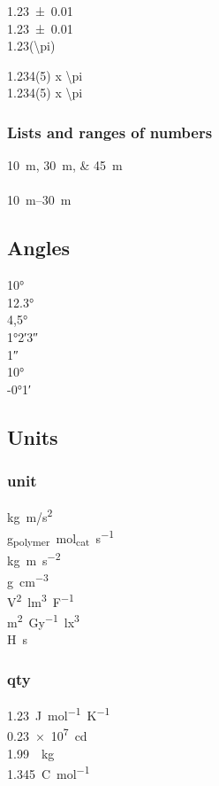 \documentclass{article}
\begin{document}
\num{1.23(1)}\\
\num{1.23\pm0.01}\\
\num[parse-numbers=false]{1.23(\pi)}

\num[parse-numbers=false]{1.234(5) x \pi} \\
\num[uncertainty-mode = separate, parse-numbers=false]{1.234(5) x \pi}

\subsubsection{Lists and ranges of numbers}

\qtylist{10;30;45}{\metre}\\
\\
\qtyrange{10}{30}{\metre}

\subsection{Angles}

\ang{10} \\
\ang{12.3} \\
\ang{4,5} \\
\ang{1;2;3} \\
\ang{;;1} \\
\ang{+10;;} \\
\ang{-0;1;}

\subsection{Units}

\subsubsection{unit}
\unit{kg.m/s^2} \\
\unit{g_{polymer}~mol_{cat}.s^{-1}} \\
\unit{\kilo\gram\metre\per\square\second} \\
\unit{\gram\per\cubic\centi\metre} \\
\unit{\square\volt\cubic\lumen\per\farad} \\
\unit{\metre\squared\per\gray\cubic\lux} \\
\unit{\henry\second}

\subsubsection{qty}
\qty[mode = text]{1.23}{J.mol^{-1}.K^{-1}} \\
\qty{.23e7}{\candela} \\
\qty[per-mode = symbol]{1.99}{\per\kilogram} \\
\qty[per-mode = fraction]{1,345}{\coulomb\per\mole}
\end{document}
